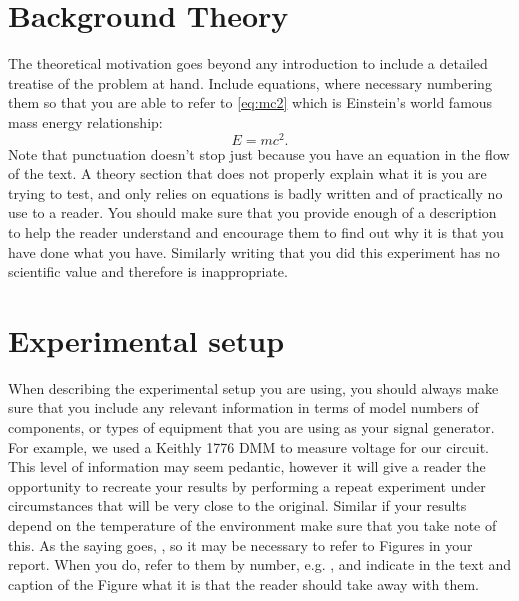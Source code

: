 \documentclass{labreport}
\begin{document}
\section*{Background Theory}
The theoretical motivation goes beyond any introduction to include a detailed   
treatise   of   the   problem   at   hand.      Include   equations,   where   necessary   numbering   
them   so   that   you   are   able   to   refer   to   \eqref{eq:mc2}   which   is   Einstein’s   world   famous   
mass energy   relationship:
\begin{equation}
\label{eq:mc2}
    E = mc^2.
\end{equation}
Note   that   punctuation   doesn’t   stop   just   because   you   have   an   equation   in   the   flow   
of   the   text.      A   theory   section   that   does   not   properly   explain   what   it   is   you   are   
trying   to   test,   and   only   relies   on   equations   is   badly   written   and   of   practically   no   
use   to   a   reader.      You   should   make   sure   that   you   provide   enough   of   a   description   
to   help   the   reader   understand   and   encourage   them   to   find   out   why   it   is   that   you   
have   done   what   you   have.      Similarly   writing   that   you   did   this   experiment   
   has   no   scientific   value   and   therefore   is   inappropriate.

\section*{Experimental setup}
When describing the experimental setup you are using, you should always make 
sure that you include any relevant information in terms of model numbers of 
components, or types of equipment that you are using as your signal generator.  
For example, we used a Keithly 1776 DMM to measure voltage for our circuit.  
This level of information may seem pedantic, however it will give a reader the 
opportunity to recreate your results by performing a repeat experiment under 
circumstances that will be very close to the original.  Similar if your results 
depend on the temperature of the environment make sure that you take note of 
this.  As the saying goes,  , so it may be necessary 
to refer to Figures in your report.  When you do, refer to them by number, e.g. 
, and indicate in the text and caption of the Figure what it is that the 
reader should take away with them.
\end{document}
